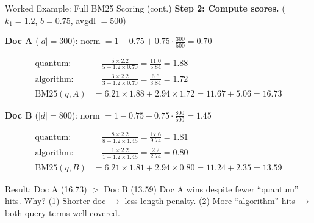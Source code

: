 \documentclass[aspectratio=169]{beamer}
\begin{document}
\begin{frame}[shrink=10]{Worked Example: Full BM25 Scoring (cont.)}
\textbf{Step 2: Compute scores.} ($k_1 = 1.2$, $b = 0.75$, avgdl $= 500$)

\vspace{0.5em}

\textbf{Doc A} ($|d| = 300$): \quad norm $= 1 - 0.75 + 0.75 \cdot \frac{300}{500} = 0.70$

\vspace{-0.3em}
{\small
\begin{align*}
\text{quantum:} &\quad \frac{5 \times 2.2}{5 + 1.2 \times 0.70} = \frac{11.0}{5.84} = 1.88 \\
\text{algorithm:} &\quad \frac{3 \times 2.2}{3 + 1.2 \times 0.70} = \frac{6.6}{3.84} = 1.72 \\
\text{BM25}(q, A) &= 6.21 \times 1.88 + 2.94 \times 1.72 = 11.67 + 5.06 = \mathbf{16.73}
\end{align*}
}

\textbf{Doc B} ($|d| = 800$): \quad norm $= 1 - 0.75 + 0.75 \cdot \frac{800}{500} = 1.45$

\vspace{-0.3em}
{\small
\begin{align*}
\text{quantum:} &\quad \frac{8 \times 2.2}{8 + 1.2 \times 1.45} = \frac{17.6}{9.74} = 1.81 \\
\text{algorithm:} &\quad \frac{1 \times 2.2}{1 + 1.2 \times 1.45} = \frac{2.2}{2.74} = 0.80 \\
\text{BM25}(q, B) &= 6.21 \times 1.81 + 2.94 \times 0.80 = 11.24 + 2.35 = \mathbf{13.59}
\end{align*}
}

\begin{exampleblock}{Result: Doc A (16.73) $>$ Doc B (13.59)}
Doc A wins despite fewer ``quantum'' hits. Why? (1) Shorter doc $\to$ less length penalty. (2) More ``algorithm'' hits $\to$ both query terms well-covered.
\end{exampleblock}
\end{frame}
\end{document}
